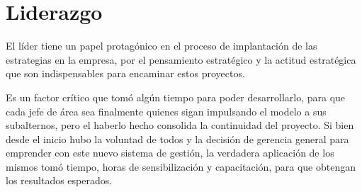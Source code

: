 \section{Liderazgo}
\item {El líder tiene un papel protagónico en el proceso de implantación de las estrategias en la empresa, por el pensamiento estratégico y la actitud estratégica que son indispensables para encaminar estos proyectos.

Es un factor crítico que tomó algún tiempo para poder desarrollarlo, para que cada jefe de área sea finalmente quienes sigan impulsando el modelo a sus subalternos, pero el haberlo hecho consolida la continuidad del proyecto. Si bien desde el inicio hubo la voluntad de todos y la decisión de gerencia general para emprender con este nuevo sistema de gestión, la verdadera aplicación de los mismos tomó tiempo, horas de sensibilización y capacitación, para que obtengan los resultados esperados.}

